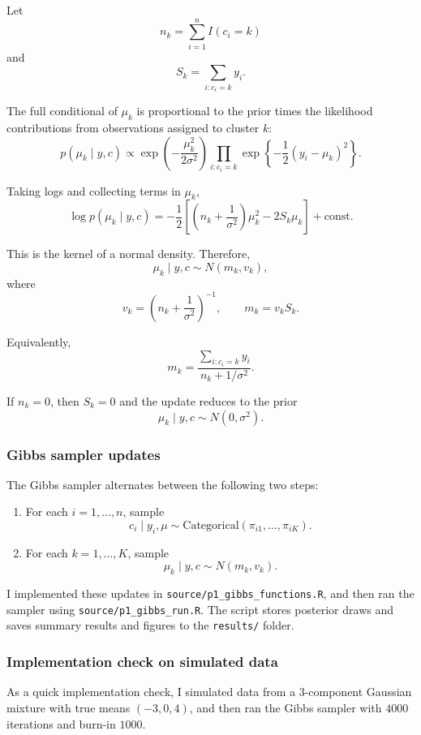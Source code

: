 \documentclass[
]{article}
\begin{document}
Let \[
n_k = \sum_{i=1}^n I(c_i = k)
\] and \[
S_k = \sum_{i:c_i=k} y_i.
\]

The full conditional of \(\mu_k\) is proportional to the prior times the
likelihood contributions from observations assigned to cluster \(k\): \[
p(\mu_k \mid y, c)
\propto
\exp\left(-\frac{\mu_k^2}{2\sigma^2}\right)
\prod_{i:c_i=k}\exp\left\{-\frac12 (y_i-\mu_k)^2\right\}.
\]

Taking logs and collecting terms in \(\mu_k\), \[
\log p(\mu_k \mid y, c)
=
-\frac12
\left[
\left(n_k + \frac{1}{\sigma^2}\right)\mu_k^2
- 2S_k\mu_k
\right]
+ \text{const}.
\]

This is the kernel of a normal density. Therefore, \[
\mu_k \mid y,c \sim N(m_k, v_k),
\] where \[
v_k = \left(n_k + \frac{1}{\sigma^2}\right)^{-1},
\qquad
m_k = v_k S_k.
\]

Equivalently, \[
m_k
=
\frac{\sum_{i:c_i=k} y_i}{n_k + 1/\sigma^2}.
\]

If \(n_k = 0\), then \(S_k = 0\) and the update reduces to the prior \[
\mu_k \mid y,c \sim N(0,\sigma^2).
\]

\subsubsection{Gibbs sampler updates}\label{gibbs-sampler-updates}

The Gibbs sampler alternates between the following two steps:

\begin{enumerate}
\def\labelenumi{\arabic{enumi}.}
\item
  For each \(i=1,\dots,n\), sample \[
  c_i \mid y_i,\mu \sim \text{Categorical}(\pi_{i1},\dots,\pi_{iK}).
  \]
\item
  For each \(k=1,\dots,K\), sample \[
  \mu_k \mid y,c \sim N(m_k,v_k).
  \]
\end{enumerate}

I implemented these updates in \texttt{source/p1\_gibbs\_functions.R},
and then ran the sampler using \texttt{source/p1\_gibbs\_run.R}. The
script stores posterior draws and saves summary results and figures to
the \texttt{results/} folder.

\subsubsection{Implementation check on simulated
data}\label{implementation-check-on-simulated-data}

As a quick implementation check, I simulated data from a 3-component
Gaussian mixture with true means \((-3, 0, 4)\), and then ran the Gibbs
sampler with \(4000\) iterations and burn-in \(1000\).
\end{document}
